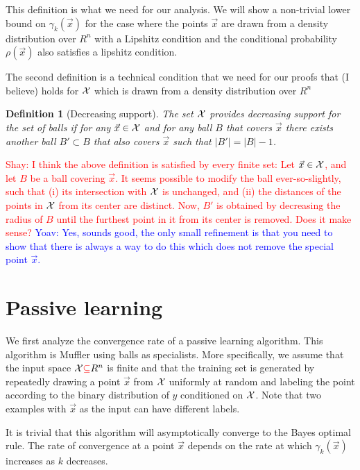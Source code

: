 \documentclass{article}
\newtheorem{definition}[theorem]{Definition}
\newcommand{\X}{{\cal X}}
\newcommand{\x}{\vec{x}}
\newcommand{\y}{\vec{y}}
\newcommand{\new}[1]{\textcolor{red}{#1}}
\newcommand{\shay}[1]{\textcolor{red}{Shay: #1}}
\newcommand{\yoav}[1]{\textcolor{blue}{Yoav: #1}}
\begin{document}
This definition is what we need for our analysis. We will show a
non-trivial lower bound on $\gamma_k(\x)$ for the case where the
points $\x$ are drawn from a density distribution over $R^n$ with a
Lipshitz condition and the conditional probability $\rho(\x)$ also
satisfies a lipshitz condition.


The second definition is a technical condition that we need for our
proofs that (I believe) holds for $\X$ which is drawn from a density
distribution over $R^n$
\begin{definition}[Decreasing support]
The set $\X$ provides decreasing support for the set of balls if for
any $\x \in \X$ and for any ball $B$ that covers $\x$ there exists
another ball $B' \subset B$ that also covers $\x$ such that $|B'| = |B|-1$.
\end{definition}

\shay{I think the above definition is satisfied by every finite set:
Let $\x \in \X$, and let $B$ be a ball covering $\x$. 
It seems possible to modify the ball ever-so-slightly, 
such that (i) its intersection with $\X$ is unchanged,  and (ii) the 
distances of the points in $\X$ from its center are distinct.
Now, $B'$ is obtained by decreasing the radius of $B$ until
the furthest point in it from its center is removed.  Does it make sense?}
\yoav{Yes, sounds good, the only small refinement is that you need to
  show that there is always a way to do this which does not remove the
  special point $\x$.}
\iffalse
We assume that $\rho$ is Lipschitz
with parameter $\alpha$, i.e. for any two vectors $\vec{x}\neq\vec{y}$.

$$\frac{\rho(\x)-\rho(\y)}{\|\x-\y\|_2} \leq \alpha$$
\fi

\section{Passive learning}

We first analyze the convergence rate of a passive learning algorithm.
This algorithm is Muffler using balls as specialists. More
specifically, we assume that the input space $\X \new{\subseteq}  R^n$ is finite
and that the training set is generated by repeatedly drawing a point
$\x$ from $\X$ uniformly at random and labeling the point according
to the binary distribution of $y$ conditioned on $\X$. Note that two
examples with $\x$ as the input can have different labels.

It is trivial that this algorithm will asymptotically converge to the
Bayes optimal rule. The rate of convergence at a point $\x$ depends on 
the rate at which $\gamma_k(\x)$ increases as $k$ decreases.
\end{document}
